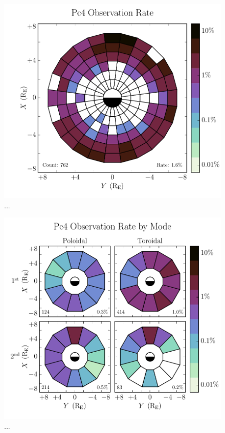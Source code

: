 \documentclass{article}
\begin{document}
\begin{figure}
    \begin{center}
    \includegraphics[width=\textwidth]{figures/fig_all.pdf}
    \caption{
        ...
    }
    \label{fig_all}
    \end{center}
\end{figure}


\begin{figure}
    \begin{center}
    \includegraphics[width=\textwidth]{figures/fig_mode.pdf}
    \caption{
        ...
    }
    \label{fig_mode}
    \end{center}
\end{figure}
\end{document}
